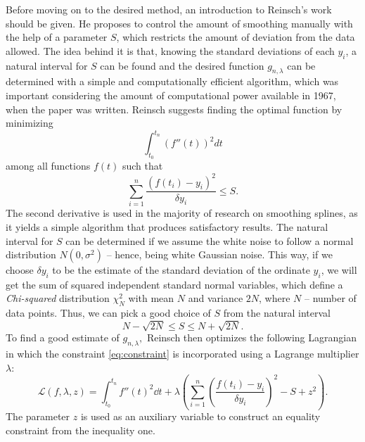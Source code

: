 \documentclass[11pt,leqno]{book}
\theoremstyle{definition}
\theoremstyle{plain}
\theoremstyle{definition}
\begin{document}
{Before moving on to the desired method, an introduction to Reinsch's \cite{REINSCH1967} work should be given. He proposes to control the amount of smoothing manually with the help of a parameter $S$, which restricts the amount of deviation from the data allowed. The idea behind it is that, knowing the standard deviations of each ${y}_i$, a natural interval for $S$ can be found and the desired function $g_{n,\lambda}$ can be determined with a simple and computationally efficient algorithm, which was important considering the amount of computational power available in 1967, when the paper was written. Reinsch suggests finding the optimal function by minimizing
\begin{equation*}
\int_{t_0}^{t_n}{(f''(t))^2dt}
\end{equation*}
among all functions $f(t)$ such that
\begin{equation}
\sum_{i=1}^{n}\frac{(f(t_i) - {y}_i)^2}{{\delta}{y}_i}\leq S.
\label{eq:constraint}
\end{equation}
The second derivative is used in the majority of research on smoothing splines, as it yields a simple algorithm that produces satisfactory results. The natural interval for $S$ can be determined if we assume the white noise to follow a normal distribution $N(0,\sigma^2)$ -- hence, being white Gaussian noise. This way, if we choose ${\delta}{y}_i$ to be the estimate of the standard deviation of the ordinate ${y}_i$, we will get the sum of squared independent standard normal variables, which define a \textit{Chi-squared} distribution $\chi^2_N$ with mean $N$ and variance $2N$, where $N$ -- number of data points. Thus, we can pick a good choice of $S$ from the natural interval 
\begin{equation*}
    N-\sqrt{2N}\leq S \leq N+\sqrt{2N}.
\end{equation*}
To find a good estimate of  $g_{n,\lambda},$ Reinsch then optimizes the following Lagrangian in which the constraint \eqref{eq:constraint} is incorporated using a Lagrange multiplier $\lambda$:
\begin{equation}
    \mathcal{L}(f, \lambda, z)=\int_{t_0}^{t_n}{f''(t)^2\dd t} + \lambda \left(\sum_{i=1}^{n}(\frac{f(t_i) - {y}_i}{{\delta}{y}_i})^2 - S + z^2\right).
\label{eq:reinsch}
\end{equation}
The parameter $z$ is used as an auxiliary variable to construct an equality constraint from the inequality one. 

}
\end{document}

